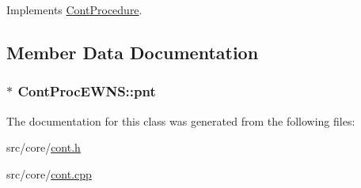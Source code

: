 Implements \hyperlink{a00067_a7f7adefe250a00b3778669ef649f03ac}{Cont\-Procedure}.



\subsection{Member Data Documentation}
\hypertarget{a00069_a8fbfa9a491ffb84d2786b78d7dd76004}{
\subsubsection[{pnt}]{$\ast$ Cont\-Proc\-E\-W\-N\-S\-::pnt\hspace{0.3cm}{\ttfamily [private]}}}\label{a00069_a8fbfa9a491ffb84d2786b78d7dd76004}


The documentation for this class was generated from the following files\-:\begin{DoxyCompactItemize}
\item 
src/core/\hyperlink{a00218}{cont.\-h}\item 
src/core/\hyperlink{a00217}{cont.\-cpp}\end{DoxyCompactItemize}
